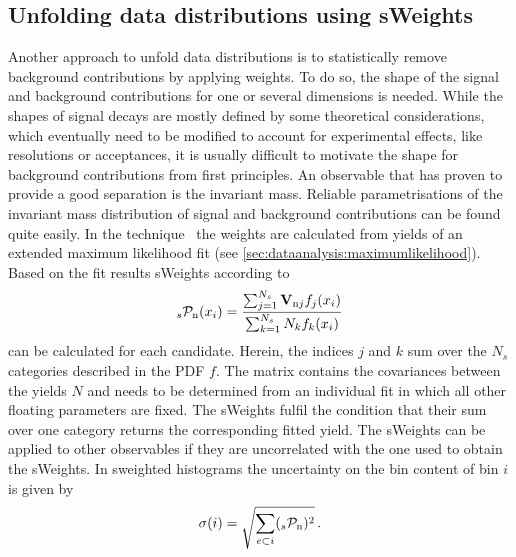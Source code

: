 
\subsection{Unfolding data distributions using sWeights}
\label{sec:dataanalysis:selection:splot}

Another approach to unfold data distributions is to statistically remove
background contributions by applying weights. To do so, the shape of the
signal and background contributions for one or several dimensions is needed.
While the shapes of signal decays are mostly defined by some theoretical
considerations, which eventually need to be modified to account for
experimental effects, like resolutions or acceptances, it is usually difficult
to motivate the shape for background contributions from first principles. An
observable that has proven to provide a good separation is the invariant mass.
Reliable parametrisations of the invariant mass distribution of signal and
background contributions can be found quite easily. In the \sPlot
technique~\cite{Pivk:2004ty} the weights are calculated from yields of an
extended maximum likelihood fit (see
\cref{sec:dataanalysis:maximumlikelihood}). Based on the fit results sWeights
according to
\begin{align}
	_{s}\mathcal{P}_\text{n}(x_i) = \frac{\sum_{j = 1}^{N_s}\mathbf{V}_{\text{n}j}f_j(x_i)}{\sum_{k = 1}^{N_s} N_k f_k(x_i)}
\label{eq:dataanalysis:selection:splot:weightdefinition}
\end{align}
can be calculated for each candidate. Herein, the indices $j$ and $k$ sum over
the $N_s$ categories described in the PDF $f$. The matrix  contains
the covariances between the yields $N$ and needs to be determined from an
individual fit in which all other floating parameters are fixed. The sWeights
fulfil the condition that their sum over one category returns the
corresponding fitted yield. The sWeights can be applied to other observables
if they are uncorrelated with the one used to obtain the sWeights. In
sweighted histograms the uncertainty on the bin content of bin $i$ is given by
\begin{align}
	\sigma(i) = \sqrt{\sum_{e \subset i} (_{s}\mathcal{P}_\text{n})^2}\,.
\label{eq:dataanalysis:selection:splot:weighterror}
\end{align}